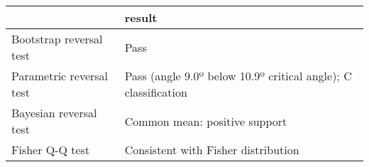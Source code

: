 \begin{tabular}{ll}
\toprule
{} &                                                          result \\
\midrule
Bootstrap reversal test  &                                                            Pass \\
Parametric reversal test &  Pass (angle 9.0º below 10.9º critical angle); C classification \\
Bayesian reversal test   &                                   Common mean: positive support \\
Fisher Q-Q test          &                             Consistent with Fisher distribution \\
\bottomrule
\end{tabular}
